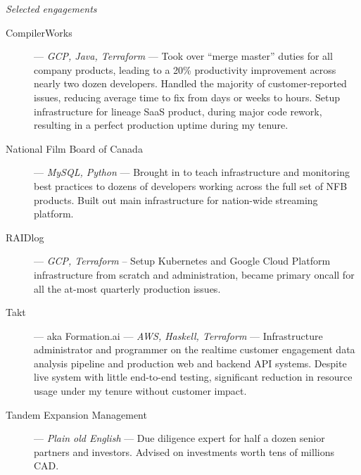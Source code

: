 \textit{\large Selected engagements}
\vspace{1 mm}
\begin{description}
\item[CompilerWorks] --- \textit{GCP, Java, Terraform} --- Took over ``merge master'' duties for all company products, leading to a 20\% productivity improvement across nearly two dozen developers. Handled the majority of customer-reported issues, reducing average time to fix from days or weeks to hours. Setup infrastructure for lineage SaaS product, during major code rework, resulting in a perfect production uptime during my tenure.
\vspace{1 mm}
\item[National Film Board of Canada] --- \textit{MySQL, Python} --- Brought in to teach infrastructure and monitoring best practices to dozens of developers working across the full set of NFB products. Built out main infrastructure for nation-wide streaming platform.
\vspace{1 mm}
\item[RAIDlog] --- \textit{GCP, Terraform} -- Setup Kubernetes and Google Cloud Platform infrastructure from scratch and administration, became primary oncall for all the at-most quarterly production issues.
\vspace{1 mm}
\item[Takt] --- aka Formation.ai --- \textit{AWS, Haskell, Terraform} --- Infrastructure administrator and programmer on the realtime customer engagement data analysis pipeline and production web and backend API systems. Despite live system with little end-to-end testing, significant reduction in resource usage under my tenure without customer impact.
\vspace{1 mm}
\item[Tandem Expansion Management] --- \textit{Plain old English} --- Due diligence expert for half a dozen senior partners and investors. Advised on investments worth tens of millions CAD.

\end{description}
